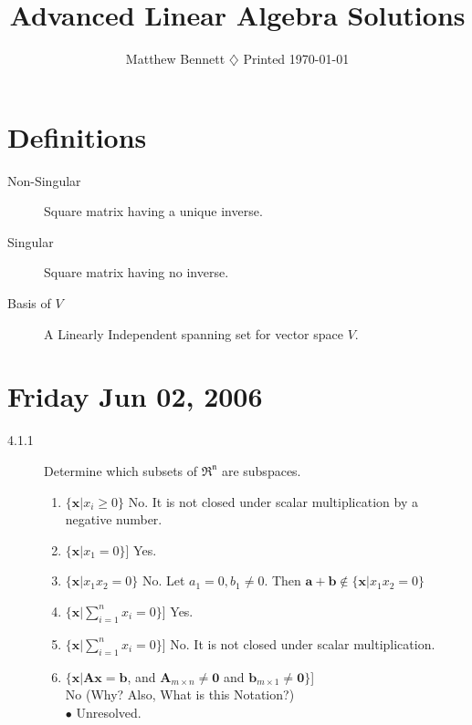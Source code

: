 \documentclass[times, 12pt]{article}
\title{Advanced Linear Algebra Solutions}
\author{Matthew Bennett $\diamondsuit$ Printed \today }
\date{ }
\begin{document}
\pagestyle{plain} \maketitle

\section{Definitions}
\begin{description}
\item[Non-Singular] Square matrix having a unique inverse.
\item[Singular] Square matrix having no inverse.
\item[Basis of $V$] A Linearly Independent spanning set for vector
space $V$.

\end{description}


\section{Friday Jun 02, 2006}

\begin{description}
\item[4.1.1] Determine which subsets of $\mathfrak{R^n}$ are
subspaces.
\begin{enumerate}
\renewcommand{\labelenumi}{(\alph{enumi})}
\item $\{\textbf{x} | x_i \geq 0\}$ No. It is not closed under scalar
multiplication by a negative number.
\item $\{\textbf{x} | x_1 = 0\}$] Yes.
\item $\{\textbf{x} | x_1 x_2 = 0\}$ No. Let $a_1 = 0, b_1 \neq
0$. Then $\textbf{a} + \textbf{b} \notin \{\textbf{x} | x_1 x_2 =
0\}$
\item $\{\textbf{x} | \displaystyle\sum_{i=1}^nx_i = 0   \}$] Yes.
\item $\{\textbf{x} | \displaystyle\sum_{i=1}^nx_i = 0  \}$]
No. It is not closed under scalar multiplication.
\item $\{\textbf{x} | \textbf{Ax} = \textbf{b}$, and $\textbf{A}_{m\times n} \neq \textbf{0}$ and $\textbf{b}_{m\times 1} \neq \textbf{0} \}$]
\\ No (Why? Also, What is this Notation?)
\\ $\bullet$ Unresolved.
\end{enumerate}
\end{description}
\end{document}
